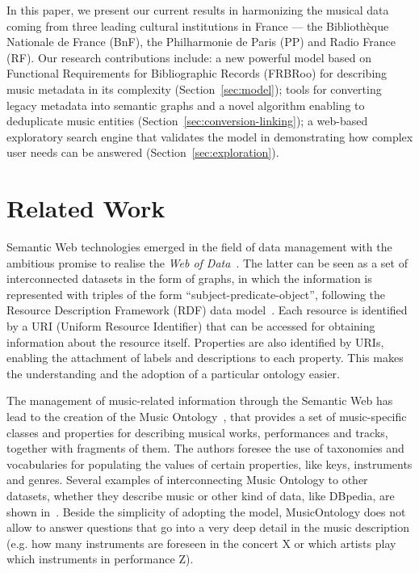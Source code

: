 In this paper, we present our current results in harmonizing the musical data coming from three leading cultural institutions in France --- the Biblioth\`eque Nationale de France (BnF), the Philharmonie de Paris (PP) and Radio France (RF). Our research contributions include: a new powerful model based on Functional Requirements for Bibliographic Records (FRBRoo) for describing music metadata in its complexity (Section~\ref{sec:model}); tools for converting legacy metadata into semantic graphs and a novel algorithm enabling to deduplicate music entities (Section~\ref{sec:conversion-linking}); a web-based exploratory search engine that validates the model in demonstrating how complex user needs can be answered  (Section~\ref{sec:exploration}).


\section{Related Work}\label{sec:related-work}
Semantic Web technologies emerged in the field of data management with the ambitious promise to realise the \textit{Web of Data}~\cite{bizer2009linked}. The latter can be seen as a set of interconnected datasets in the form of graphs, in which the information is represented with triples of the form ``subject-predicate-object'', following the Resource Description Framework (RDF) data model~\cite{pan2009rdf}. Each resource is identified by a URI (Uniform Resource Identifier) that can be accessed for obtaining information about the resource itself. Properties are also identified by URIs, enabling the attachment of labels and descriptions to each property. This makes the understanding and the adoption of a particular ontology easier.

The management of music-related information through the Semantic Web has lead to the creation of the Music Ontology~\cite{raimond2007music}, that provides a set of music-specific classes and properties for describing musical works, performances and tracks, together with fragments of them. The authors foresee the use of taxonomies and vocabularies for populating the values of certain properties, like keys, instruments and genres. Several examples of interconnecting Music Ontology to other datasets, whether they describe music or other kind of data, like DBpedia, are shown in~\cite{raimond2008webmusic}. Beside the simplicity of adopting the model, MusicOntology does not allow to answer questions that go into a very deep detail in the music description (e.g. how many instruments are foreseen in the concert X or which artists play which instruments in performance Z).

